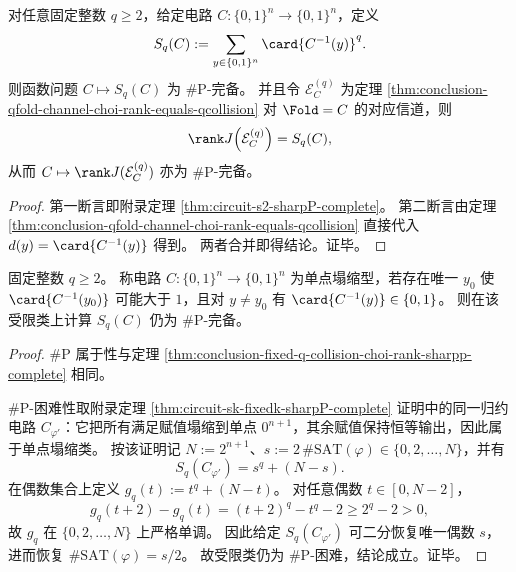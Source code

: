 \begin{theorem}[固定阶 \texorpdfstring{$q\ge 2$}{q>=2} 时碰撞矩与对应 Choi 秩计算的 \texorpdfstring{\(\#\mathrm{P}\)}{\#P} 完备性]\label{thm:conclusion-fixed-q-collision-choi-rank-sharpp-complete}
对任意固定整数 \(q\ge 2\)，给定电路 \(C:\{0,1\}^n\to\{0,1\}^n\)，定义
\[
S_q(C):=\sum_{y\in\{0,1\}^n}\card{C^{-1}(y)}^q.
\]
则函数问题 \(C\mapsto S_q(C)\) 为 \(\#\mathrm P\)-完备。
并且令 \(\mathcal E_C^{(q)}\) 为定理 \ref{thm:conclusion-qfold-channel-choi-rank-equals-qcollision} 对 \(\Fold=C\) 的对应信道，则
\[
\rank J\!\left(\mathcal E_C^{(q)}\right)=S_q(C),
\]
从而 \(C\mapsto \rank J(\mathcal E_C^{(q)})\) 亦为 \(\#\mathrm P\)-完备。
\end{theorem}
\begin{proof}
第一断言即附录定理 \ref{thm:circuit-s2-sharpP-complete}。
第二断言由定理 \ref{thm:conclusion-qfold-channel-choi-rank-equals-qcollision} 直接代入 \(d(y)=\card{C^{-1}(y)}\) 得到。
两者合并即得结论。证毕。
\end{proof}

\begin{theorem}\label{thm:conclusion-single-collapse-collision-sharpp-complete}
固定整数 \(q\ge 2\)。
称电路 \(C:\{0,1\}^n\to\{0,1\}^n\) 为单点塌缩型，若存在唯一 \(y_0\) 使 \(\card{C^{-1}(y_0)}\) 可能大于 \(1\)，且对 \(y\neq y_0\) 有 \(\card{C^{-1}(y)}\in\{0,1\}\)。
则在该受限类上计算 \(S_q(C)\) 仍为 \(\#\mathrm P\)-完备。
\end{theorem}
\begin{proof}
\(\#\mathrm P\) 属于性与定理 \ref{thm:conclusion-fixed-q-collision-choi-rank-sharpp-complete} 相同。

\(\#\mathrm P\)-困难性取附录定理 \ref{thm:circuit-sk-fixedk-sharpP-complete} 证明中的同一归约电路 \(C_{\varphi'}\)：它把所有满足赋值塌缩到单点 \(0^{n+1}\)，其余赋值保持恒等输出，因此属于单点塌缩类。
按该证明记 \(N:=2^{n+1}\)、\(s:=2\,\#\mathrm{SAT}(\varphi)\in\{0,2,\dots,N\}\)，并有
\[
S_q(C_{\varphi'})=s^q+(N-s).
\]
在偶数集合上定义 \(g_q(t):=t^q+(N-t)\)。
对任意偶数 \(t\in[0,N-2]\)，
\[
g_q(t+2)-g_q(t)=(t+2)^q-t^q-2\ge 2^q-2>0,
\]
故 \(g_q\) 在 \(\{0,2,\dots,N\}\) 上严格单调。
因此给定 \(S_q(C_{\varphi'})\) 可二分恢复唯一偶数 \(s\)，进而恢复 \(\#\mathrm{SAT}(\varphi)=s/2\)。
故受限类仍为 \(\#\mathrm P\)-困难，结论成立。证毕。
\end{proof}

